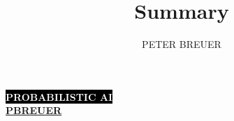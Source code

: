 \documentclass[tikz, tcolorbox]{summary}
\title{Summary}
\author{PETER BREUER}
\begin{document}
	\setcounter{page}{1}
	\pagestyle{plain}

	\begin{multicols*}{3}
		\LARGE \textbf{\colorbox{black}{\textcolor{white}{PROBABILISTIC AI}}} \\
		\normalsize 
        \textbf{\colorbox{color2}{\textcolor{white}{\href{mailto:pbreuer@ethz.ch}{PBREUER}}}}
        \normalsize
        \raggedcolumns
        
		
        
        
        
        
        
        
        
        
        
        
        
        

  
        
	\end{multicols*}
	\clearpage
\end{document}
